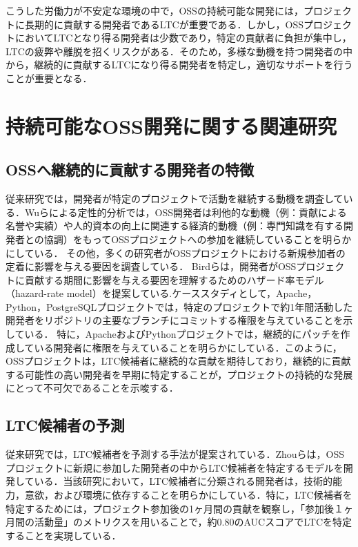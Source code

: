 \documentclass[11pt]{jreport}
\begin{document}
こうした労働力が不安定な環境の中で，OSSの持続可能な開発には，プロジェクトに長期的に貢献する開発者であるLTCが重要である．しかし，OSSプロジェクトにおいてLTCとなり得る開発者は少数であり，特定の貢献者に負担が集中し，LTCの疲弊や離脱を招くリスクがある．そのため，多様な動機を持つ開発者の中から，継続的に貢献するLTCになり得る開発者を特定し，適切なサポートを行うことが重要となる\cite{related2}\cite{sport}．




\section{持続可能なOSS開発に関する関連研究}
\subsection{OSSへ継続的に貢献する開発者の特徴}

従来研究では，開発者が特定のプロジェクトで活動を継続する動機を調査している．Wuらによる定性的分析では，OSS開発者は利他的な動機（例：貢献による名誉や実績）や人的資本の向上に関連する経済的動機（例：専門知識を有する開発者との協調）をもってOSSプロジェクトへの参加を継続していることを明らかにしている\cite{motivation2}．
その他，多くの研究者がOSSプロジェクトにおける新規参加者の定着に影響を与える要因を調査している\cite{LTC}\cite{rolemigration}\cite{hazard}\cite{abandon}．
Birdらは，開発者がOSSプロジェクトに貢献する期間に影響を与える要因を理解するためのハザード率モデル（hazard-rate model）を提案している\cite{hazard}.ケーススタディとして，Apache，Python，PostgreSQLプロジェクトでは，特定のプロジェクトで約1年間活動した開発者をリポジトリの主要なブランチにコミットする権限を与えていることを示している．
特に，ApacheおよびPythonプロジェクトでは，継続的にパッチを作成している開発者に権限を与えていることを明らかにしている．このように，OSSプロジェクトは，LTC候補者に継続的な貢献を期待しており，継続的に貢献する可能性の高い開発者を早期に特定することが，プロジェクトの持続的な発展にとって不可欠であることを示唆する．


\subsection{LTC候補者の予測}

従来研究では，LTC候補者を予測する手法が提案されている\cite{related1}\cite{LTC}\cite{ihara_LTC}．Zhouらは，OSSプロジェクトに新規に参加した開発者の中からLTC候補者を特定するモデルを開発している\cite{LTC}．当該研究において，LTC候補者に分類される開発者は，技術的能力，意欲，および環境に依存することを明らかにしている．特に，LTC候補者を特定するためには，プロジェクト参加後の1ヶ月間の貢献を観察し，「参加後１ヶ月間の活動量」のメトリクスを用いることで，約0.80のAUCスコアでLTCを特定することを実現している．
\end{document}
